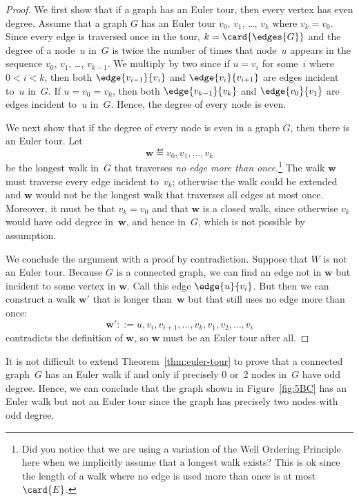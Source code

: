 \begin{proof}
  We first show that if a graph has an Euler tour, then every vertex has
  even degree.  Assume that a graph $G$ has an Euler tour $v_0$, $v_1$,
  \dots, $v_k$ where $v_k = v_0$.  Since every edge is traversed once in
  the tour, $k = \card{\edges{G}}$ and the degree of a node~$u$ in~$G$ is
  twice the number of times that node~$u$ appears in the sequence $v_0$,
  $v_1$, \dots, $v_{k-1}$.  We multiply by two since if $u = v_i$ for
  some~$i$ where $0 < i < k$, then both $\edge{v_{i - 1}}{v_i}$ and
  $\edge{v_i}{v_{i + 1}}$ are edges incident to~$u$ in~$G$.  If $u = v_0 =
  v_k$, then both $\edge{v_{k - 1}}{v_k}$ and $\edge{v_0}{v_1}$ are edges
  incident to~$u$ in~$G$.  Hence, the degree of every node is even.

We next show that if the degree of every node is even in a graph
$G$, then there is an Euler tour.  Let
\[
\mathbf{w} \eqdef v_0, v_1, \dots, v_k
\]
be the longest walk in~$G$ that traverses \emph{no edge more than
  once}.\footnote{Did you notice that we are using a variation of the
  Well Ordering Principle here when we implicitly assume that a
  longest walk exists?  This is ok since the length of a walk where no
  edge is used more than once is at most~$\card{E}$.}  The walk
$\mathbf{w}$ must traverse every edge incident to~$v_k$; otherwise the
walk could be extended and $\mathbf{w}$ would not be the longest walk
that traverses all edges at most once.  Moreover, it must be that $v_k
= v_0$ and that $\mathbf{w}$ is a closed walk, since otherwise $v_k$
would have odd degree in~$\mathbf{w}$, and hence in~$G$, which is not
possible by assumption.

We conclude the argument with a proof by contradiction.  Suppose that
$W$ is not an Euler tour.  Because $G$ is a connected graph, we can
find an edge not in $\mathbf{w}$ but incident to some vertex in $\mathbf{w}$.  Call this
edge $\edge{u}{v_i}$.  But then we can construct a walk $\mathbf{w}'$ that is
longer than~$\mathbf{w}$ but that still uses no edge more than once:
\[
   \mathbf{w}' ::= u, v_i, v_{i + 1}, \dots, v_k, v_1, v_2, \dots, v_i
\]
contradicts the definition of $\mathbf{w}$, so $\mathbf{w}$ must be an
Euler tour after all.
\end{proof}

It is not difficult to extend Theorem~\ref{thm:euler-tour} to prove that a
connected graph~$G$ has an Euler walk if and only if precisely 0 or~2
nodes in~$G$ have odd degree.  Hence, we can conclude that the graph
shown in Figure~\ref{fig:5BC} has an Euler walk but not an Euler tour
since the graph has precisely two nodes with odd degree.

